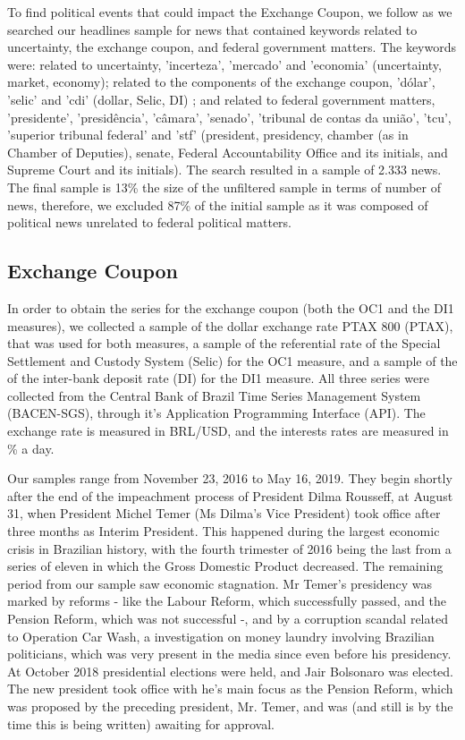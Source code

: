 \documentclass[cic,tc, english]{iiufrgs}
\begin{document}
    To find political events that could impact the Exchange Coupon, we follow \citet{bbb} as we searched our headlines sample for news that contained keywords related to uncertainty, the exchange coupon, and federal government matters. The keywords were: related to uncertainty, 'incerteza', 'mercado' and 'economia' (uncertainty, market, economy); related to the components of the exchange coupon, 'dólar', 'selic' and 'cdi' (dollar, Selic, DI) ; and related to federal government matters, 'presidente', 'presidência', 'câmara', 'senado', 'tribunal de contas da união', 'tcu', 'superior tribunal federal' and 'stf' (president, presidency, chamber (as in Chamber of Deputies), senate, Federal Accountability Office and its initials, and Supreme Court and its initials). The search resulted in a sample of 2.333 news. The final sample is 13\% the size of the unfiltered sample in terms of number of news, therefore, we excluded 87\% of the initial sample as it was composed of political news unrelated to federal political matters.

\subsection{Exchange Coupon} \label{chapter_exchange_coupon}

    In order to obtain the series for the exchange coupon (both the OC1 and the DI1 measures), we collected a sample of the dollar exchange rate PTAX 800 (PTAX), that was used for both measures, a sample of the referential rate of the Special Settlement and Custody System (Selic) for the OC1 measure, and a sample of the of the inter-bank deposit rate (DI) for the DI1 measure. All three series were collected from the Central Bank of Brazil Time Series Management System (BACEN-SGS), through it's Application Programming Interface (API). The exchange rate is measured in BRL/USD, and the interests rates are measured in \% a day.
    
    Our samples range from November 23, 2016 to May 16, 2019. They begin shortly after the end of the impeachment process of President Dilma Rousseff, at August 31, when President Michel Temer (Ms Dilma's Vice President) took office after three months as Interim President. This happened during the largest economic crisis in Brazilian history, with the fourth trimester of 2016 being the last from a series of eleven in which the Gross Domestic Product decreased. The remaining period from our sample saw economic stagnation. Mr Temer's presidency was marked by reforms - like the Labour Reform, which successfully passed, and the Pension Reform, which was not successful -, and by a corruption scandal related to Operation Car Wash, a investigation on money laundry involving Brazilian politicians, which was very present in the media since even before his presidency. At October 2018 presidential elections were held, and Jair Bolsonaro was elected. The new president took office with he's main focus as the Pension Reform, which was proposed by the preceding president, Mr. Temer, and was (and still is by the time this is being written) awaiting for approval.
    
\end{document}
